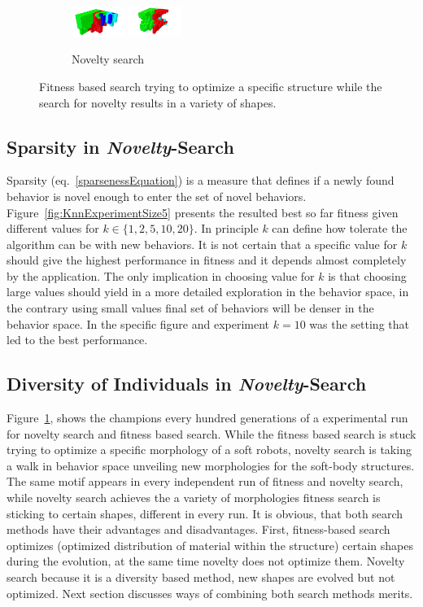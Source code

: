 \begin{figure}[t!]
\begin{subfigure}[b]{1.0\textwidth}
\includegraphics[width=0.19\textwidth]{../Figures/Robots/n_4_g_900.jpg}
\includegraphics[width=0.19\textwidth]{../Figures/Robots/n_4_g_1000.jpg}
\caption{Novelty search}
\end{subfigure}
\caption{Fitness based search trying to optimize a specific structure while the search for novelty results in a variety of shapes.}
\label{fig:morphologies}
\end{figure}


\subsection{Sparsity in \emph{Novelty}-Search}

Sparsity (eq.~\ref{sparsenessEquation}) is a measure that defines if a newly found behavior is novel enough to enter the set of novel behaviors. Figure~\ref{fig:KnnExperimentSize5} presents the resulted best so far fitness given different values for $k \in \lbrace 1, 2, 5, 10, 20 \rbrace$. In principle $k$ can define how tolerate the algorithm can be with new behaviors. It is not certain that a specific value for $k$ should give the highest performance in fitness and it depends almost completely by the application. The only implication in choosing value for $k$ is that choosing large values should yield in a more detailed exploration in the behavior space, in the contrary using small values final set of behaviors will be denser in the behavior space. In the specific figure and experiment $k=10$ was the setting that led to the best performance.

\subsection{Diversity of Individuals in \emph{Novelty}-Search}

Figure~\ref{fig:morphologies}, shows the champions every hundred generations of a experimental run for novelty search and fitness based search. While the fitness based search is stuck trying to optimize a specific morphology of a soft robots, novelty search is taking a walk in behavior space unveiling new morphologies for the soft-body structures. The same motif appears in every independent run of fitness and novelty search, while novelty search achieves the a variety of morphologies fitness search is sticking to certain shapes, different in every run. It is obvious, that both search methods have their advantages and disadvantages. First, fitness-based search optimizes (optimized distribution of material within the structure) certain shapes during the evolution, at the same time novelty does not optimize them. Novelty search because it is a diversity based method, new shapes are evolved but not optimized. Next section discusses ways of combining both search methods merits.

